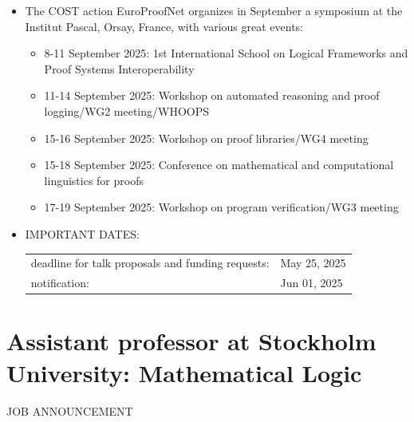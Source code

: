\documentclass[prodmode,acmtecs]{acmsmall} %
\begin{document}
\begin{itemize}\item  The COST action EuroProofNet organizes in September a symposium at the Institut Pascal, Orsay, France, with various great events: 
 
\begin{itemize}\item  8-11 September 2025: 1st International School on Logical Frameworks and Proof Systems Interoperability
\item  11-14 September 2025: Workshop on automated reasoning and proof logging/WG2 meeting/WHOOPS
\item  15-16 September 2025: Workshop on proof libraries/WG4 meeting
\item  15-18 September 2025: Conference on mathematical and computational linguistics for proofs
\item  17-19 September 2025: Workshop on program verification/WG3 meeting
\end{itemize} 
\item IMPORTANT DATES: 
 
\begin{tabulary}{\linewidth}{LL}deadline for talk proposals and funding requests:  & May 25, 2025 \\
notification:  & Jun 01, 2025 \\
\end{tabulary}
 
\end{itemize}\section{Assistant professor at Stockholm University: Mathematical Logic }\label{AssistantprofessoratStockholmUniversity}JOB ANNOUNCEMENT 
\end{document}

